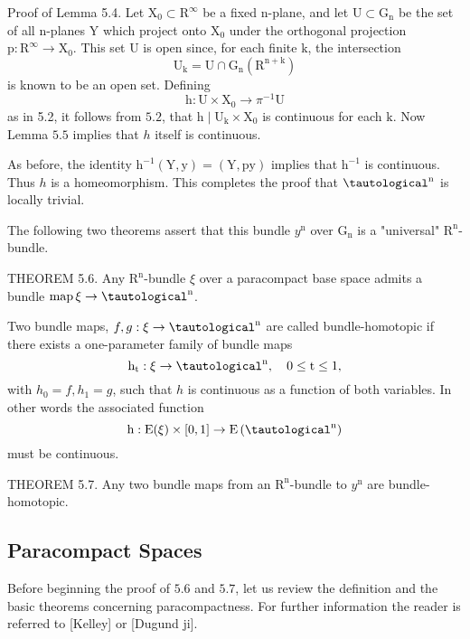 \documentclass[10pt]{article}
\begin{document}
Proof of Lemma 5.4. Let $\mathrm{X}_{0} \subset \mathrm{R}^{\infty}$ be a fixed $\mathrm{n}$-plane, and let $\mathrm{U} \subset \mathrm{G}_{\mathrm{n}}$ be the set of all $\mathrm{n}$-planes $\mathrm{Y}$ which project onto $\mathrm{X}_{0}$ under the orthogonal projection $\mathrm{p}: \mathrm{R}^{\infty} \rightarrow \mathrm{X}_{0}$. This set $\mathrm{U}$ is open since, for each finite $\mathrm{k}$, the intersection
$$
\mathrm{U}_{\mathrm{k}}=\mathrm{U} \cap \mathrm{G}_{\mathrm{n}}\left(\mathrm{R}^{\mathrm{n}+\mathrm{k}}\right)
$$
is known to be an open set. Defining
$$
\mathrm{h}: \mathrm{U} \times \mathrm{X}_{0} \rightarrow \pi^{-1} \mathrm{U}
$$
as in 5.2, it follows from $5.2$, that $\mathrm{h} \mid \mathrm{U}_{\mathrm{k}} \times \mathrm{X}_{0}$ is continuous for each $\mathrm{k}$. Now Lemma $5.5$ implies that $h$ itself is continuous.

As before, the identity $\mathrm{h}^{-1}(\mathrm{Y}, \mathrm{y})=(\mathrm{Y}, \mathrm{py})$ implies that $\mathrm{h}^{-1}$ is continuous. Thus $h$ is a homeomorphism. This completes the proof that $\tautological^{\mathrm{n}}$ is locally trivial.

The following two theorems assert that this bundle $y^{\mathrm{n}}$ over $\mathrm{G}_{\mathrm{n}}$ is a "universal" $\mathrm{R}^{\mathrm{n}}$-bundle.

THEOREM 5.6. Any $\mathrm{R}^{\mathrm{n}}$-bundle $\xi$ over a paracompact base space admits a bundle $\operatorname{map} \xi \rightarrow \tautological^{\mathrm{n}}$.

Two bundle maps, $f, g: \xi \rightarrow \tautological^{\mathrm{n}}$ are called bundle-homotopic if there exists a one-parameter family of bundle maps
$$
\mathrm{h}_{\mathrm{t}}: \xi \rightarrow \tautological^{\mathrm{n}}, \quad 0 \leq \mathrm{t} \leq 1,
$$
with $h_{0}=f, h_{1}=g$, such that $h$ is continuous as a function of both variables. In other words the associated function
$$
\mathrm{h}: \mathrm{E}(\xi) \times[0,1] \rightarrow \mathrm{E}\left(\tautological^{\mathrm{n}}\right)
$$
must be continuous.

THEOREM 5.7. Any two bundle maps from an $\mathrm{R}^{\mathrm{n}}$-bundle to $y^{\mathrm{n}}$ are bundle-homotopic.

\subsection{Paracompact Spaces}
Before beginning the proof of $5.6$ and $5.7$, let us review the definition and the basic theorems concerning paracompactness. For further information the reader is referred to [Kelley] or [Dugund ji].
\end{document}
